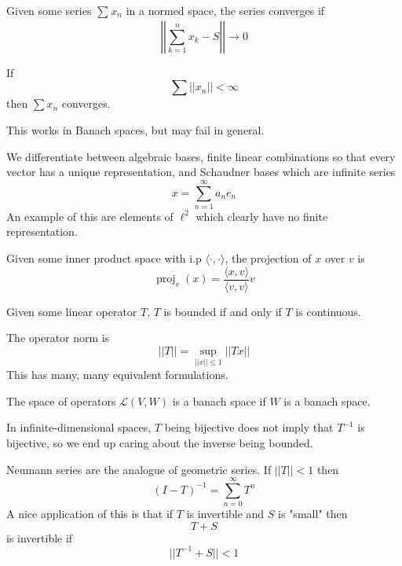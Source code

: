 Given some series $\sum_{}^{}x_n$ in a normed space, the 
series converges if 
\[
    \left|\left|
        \displaystyle\sum_{k=1}^{n}x_k - S
    \right|\right| 
    \to 0
\]

If 
\[
    \displaystyle\sum ||x_n|| < \infty
\]
then $\sum x_n$ converges.

This works in Banach spaces, but may fail in general.

We differentiate between algebraic bases, finite linear 
combinations so that every vector has a unique representation, 
and Schaudner bases which are infinite series 
\[
    x = \displaystyle\sum_{n=1}^{\infty}a_ne_n
\]
An example of this are elements of $\ell^2$ which clearly 
have no finite representation.

Given some inner product space with i.p $\langle \cdot,\cdot \rangle$,
the projection of $x$ over $v$ is 
\[
    \operatorname{proj}_v(x) = 
    \frac{\langle x,v\rangle}{\langle v, v \rangle} v
\]

Given some linear operator $T$, $T$ is bounded if and only if 
$T$ is continuous.

The operator norm is 
\[
    ||T|| = \sup_{||x||\leq 1}||Tx||
\]
This has many, many equivalent formulations.

The space of operators $\mathcal L(V,W)$ is a banach space 
if $W$ is a banach space. 

In infinite-dimensional spaces, $T$ being bijective does not imply 
that $T^{-1}$ is bijective, so we end up caring about 
the inverse being bounded.

Neumann series are the analogue of geometric series. 
If $||T|| < 1$ then 
\[
    (I-T)^{-1} = \displaystyle\sum_{n=0}^{\infty}T^n
\]
A nice application of this is that if $T$ is invertible 
and $S$ is "small" then 
\[
    T + S
\]
is invertible if 
\[
    ||T^{-1}+S|| < 1
\]

\newpage 
